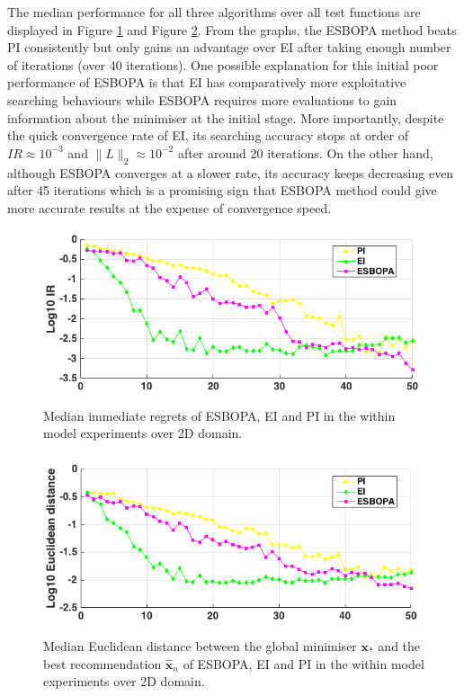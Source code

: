 \documentclass[a4paper,11pt]{report}
\begin{document}
\noindent
The median performance for all three algorithms over all test functions are displayed in Figure \ref{2DtestIR} and Figure \ref{2DtestXnorm2}. From the graphs, the ESBOPA method beats PI consistently but only gains an advantage over EI after taking enough number of iterations (over 40 iterations). One possible explanation for this initial poor performance of ESBOPA is that EI has comparatively more exploitative searching behaviours while ESBOPA requires more evaluations to gain information about the minimiser at the initial stage. More importantly, despite the quick convergence rate of EI, its searching accuracy stops at order of $IR \approx10^{-3}$ and $\| L\| _{2} \approx 10^{-2}$ after around 20 iterations. On the other hand, although ESBOPA converges at a slower rate, its accuracy keeps decreasing even after  45 iterations which is a promising sign that ESBOPA method could give more accurate results at the expense of convergence speed. 
\\
\begin{figure} [H] \label{2DtestIR}
	\centering
	 \includegraphics[width=0.8\linewidth]{2DtestESBOPAV3_seed_20_80IR.png}
\caption{ Median immediate regrets of ESBOPA, EI and PI in the within model experiments over 2D domain.}
\end{figure}

\begin{figure} [H]
\label{2DtestXnorm2}
	\centering
	 \includegraphics[width=0.8\linewidth]{2DtestESBOPAV3_seed_20_80Xnorm2.png}
\caption{ Median Euclidean distance between the global minimiser $\mathbf{x}_{*}$ and the best recommendation $ \hat{\mathbf{x}}_{n}$ of ESBOPA, EI and PI in the within model experiments over 2D domain.}
\end{figure}
\end{document}
